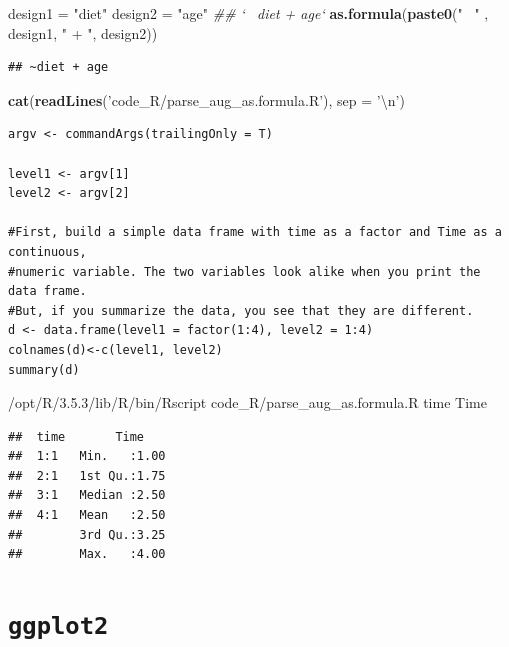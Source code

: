 \documentclass[]{book}
\makeatletter
\newenvironment{Shaded}{\begin{snugshade}}{\end{snugshade}}
\newcommand{\CharTok}[1]{\textcolor[rgb]{0.31,0.60,0.02}{#1}}
\newcommand{\CommentTok}[1]{\textcolor[rgb]{0.56,0.35,0.01}{\textit{#1}}}
\newcommand{\DataTypeTok}[1]{\textcolor[rgb]{0.13,0.29,0.53}{#1}}
\newcommand{\ExtensionTok}[1]{#1}
\newcommand{\KeywordTok}[1]{\textcolor[rgb]{0.13,0.29,0.53}{\textbf{#1}}}
\newcommand{\NormalTok}[1]{#1}
\newcommand{\StringTok}[1]{\textcolor[rgb]{0.31,0.60,0.02}{#1}}
\newenvironment{kframe}{%
\medskip{}
\setlength{\fboxsep}{.8em}
 \def\at@end@of@kframe{}%
 \ifinner\ifhmode%
  \def\at@end@of@kframe{\end{minipage}}%
  \begin{minipage}{\columnwidth}%
 \fi\fi%
 \def\FrameCommand##1{\hskip\@totalleftmargin \hskip-\fboxsep
 \colorbox{shadecolor}{##1}\hskip-\fboxsep
     \hskip-\linewidth \hskip-\@totalleftmargin \hskip\columnwidth}%
 \MakeFramed {\advance\hsize-\width
   \@totalleftmargin\z@ \linewidth\hsize
   \@setminipage}}%
 {\par\unskip\endMakeFramed%
 \at@end@of@kframe}
\renewenvironment{Shaded}{\begin{kframe}}{\end{kframe}}
\makeatother
\begin{document}
\begin{Shaded}
\begin{Highlighting}[]
\NormalTok{design1 =}\StringTok{ "diet"}
\NormalTok{design2 =}\StringTok{ "age"}
\CommentTok{## `~ diet + age`}
\KeywordTok{as.formula}\NormalTok{(}\KeywordTok{paste0}\NormalTok{(}\StringTok{"~ "}\NormalTok{ , design1, }\StringTok{" + "}\NormalTok{, design2))}
\end{Highlighting}
\end{Shaded}

\begin{verbatim}
## ~diet + age
\end{verbatim}

\begin{Shaded}
\begin{Highlighting}[]
\KeywordTok{cat}\NormalTok{(}\KeywordTok{readLines}\NormalTok{(}\StringTok{'code_R/parse_aug_as.formula.R'}\NormalTok{), }\DataTypeTok{sep =} \StringTok{'}\CharTok{\textbackslash{}n}\StringTok{'}\NormalTok{)}
\end{Highlighting}
\end{Shaded}

\begin{verbatim}
argv <- commandArgs(trailingOnly = T)

level1 <- argv[1]
level2 <- argv[2]

#First, build a simple data frame with time as a factor and Time as a continuous,
#numeric variable. The two variables look alike when you print the data frame.
#But, if you summarize the data, you see that they are different.
d <- data.frame(level1 = factor(1:4), level2 = 1:4)
colnames(d)<-c(level1, level2)
summary(d)
\end{verbatim}

\begin{Shaded}
\begin{Highlighting}[]
\ExtensionTok{/opt/R/3.5.3/lib/R/bin/Rscript}\NormalTok{ code_R/parse_aug_as.formula.R time Time}
\end{Highlighting}
\end{Shaded}

\begin{verbatim}
##  time       Time     
##  1:1   Min.   :1.00  
##  2:1   1st Qu.:1.75  
##  3:1   Median :2.50  
##  4:1   Mean   :2.50  
##        3rd Qu.:3.25  
##        Max.   :4.00
\end{verbatim}

\hypertarget{ggplot2}{%
\chapter{\texorpdfstring{\texttt{ggplot2}}{ggplot2}}\label{ggplot2}}
\end{document}
